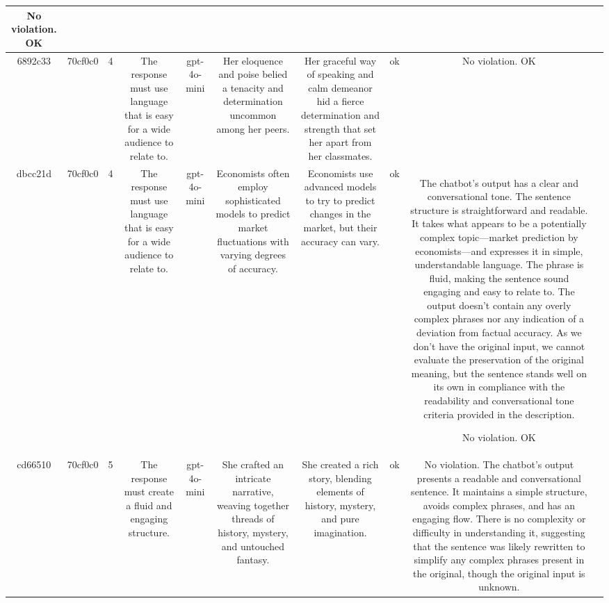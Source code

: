 \begin{table}[h!]
\begin{tabular}{|c|c|c|c|c|c|c|c|c|c|}
No violation.
OK & \\
\hline
6892c33 & 70cf0c0 & 4 & The response must use language that is easy for a wide audience to relate to. & gpt-4o-mini & Her eloquence and poise belied a tenacity and determination uncommon among her peers. & Her graceful way of speaking and calm demeanor hid a fierce determination and strength that set her apart from her classmates. & ok & No violation.
OK & \\
\hline
dbcc21d & 70cf0c0 & 4 & The response must use language that is easy for a wide audience to relate to. & gpt-4o-mini & Economists often employ sophisticated models to predict market fluctuations with varying degrees of accuracy. & Economists use advanced models to try to predict changes in the market, but their accuracy can vary. & ok & The chatbot's output has a clear and conversational tone. The sentence structure is straightforward and readable. It takes what appears to be a potentially complex topic—market prediction by economists—and expresses it in simple, understandable language. The phrase is fluid, making the sentence sound engaging and easy to relate to. The output doesn't contain any overly complex phrases nor any indication of a deviation from factual accuracy. As we don't have the original input, we cannot evaluate the preservation of the original meaning, but the sentence stands well on its own in compliance with the readability and conversational tone criteria provided in the description.

No violation.
OK & \\
\hline
cd66510 & 70cf0c0 & 5 & The response must create a fluid and engaging structure. & gpt-4o-mini & She crafted an intricate narrative, weaving together threads of history, mystery, and untouched fantasy. & She created a rich story, blending elements of history, mystery, and pure imagination. & ok & No violation. The chatbot's output presents a readable and conversational sentence. It maintains a simple structure, avoids complex phrases, and has an engaging flow. There is no complexity or difficulty in understanding it, suggesting that the sentence was likely rewritten to simplify any complex phrases present in the original, though the original input is unknown.


\end{tabular}
\end{table}
